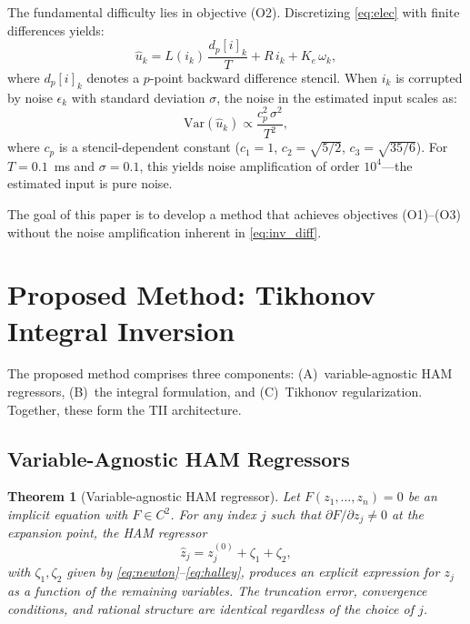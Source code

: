 \documentclass[lettersize,journal]{IEEEtran}
\newtheorem{theorem}{Theorem}
\begin{document}
The fundamental difficulty lies in objective (O2). Discretizing \eqref{eq:elec} with finite differences yields:
\begin{equation}
\label{eq:inv_diff}
\hat{u}_k = L(i_k)\,\frac{d_p[i]_k}{T} + R\,i_k + K_e\,\omega_k,
\end{equation}
where $d_p[i]_k$ denotes a $p$-point backward difference stencil. When $i_k$ is corrupted by noise $\epsilon_k$ with standard deviation $\sigma$, the noise in the estimated input scales as:
\begin{equation}
\label{eq:noise_amp}
\text{Var}(\hat{u}_k) \propto \frac{c_p^2 \, \sigma^2}{T^2},
\end{equation}
where $c_p$ is a stencil-dependent constant ($c_1 = 1$, $c_2 = \sqrt{5/2}$, $c_3 = \sqrt{35/6}$). For $T = 0.1$~ms and $\sigma = 0.1$, this yields noise amplification of order $10^4$---the estimated input is pure noise.

The goal of this paper is to develop a method that achieves objectives (O1)--(O3) without the noise amplification inherent in \eqref{eq:inv_diff}.

\section{Proposed Method: Tikhonov Integral Inversion}
\label{sec:method}

The proposed method comprises three components: (A)~variable-agnostic HAM regressors, (B)~the integral formulation, and (C)~Tikhonov regularization. Together, these form the TII architecture.

\subsection{Variable-Agnostic HAM Regressors}

\begin{theorem}[Variable-agnostic HAM regressor]
\label{thm:agnostic}
Let $F(z_1, \ldots, z_n) = 0$ be an implicit equation with $F \in C^2$. For any index $j$ such that $\partial F / \partial z_j \neq 0$ at the expansion point, the HAM regressor
\begin{equation}
\label{eq:ham_regressor}
\hat{z}_j = z_j^{(0)} + \zeta_1 + \zeta_2,
\end{equation}
with $\zeta_1, \zeta_2$ given by \eqref{eq:newton}--\eqref{eq:halley}, produces an explicit expression for $z_j$ as a function of the remaining variables. The truncation error, convergence conditions, and rational structure are identical regardless of the choice of $j$.
\end{theorem}
\end{document}

